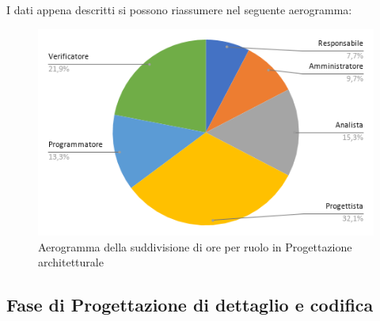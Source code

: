        I dati appena descritti si possono riassumere nel seguente aerogramma:
        \begin{figure}[!h]
            \vspace{5px}
            \includegraphics[scale=0.5]{../../../Images/Diagrammi/Diagramma a torta/ore architettura.png}
            \centering
            \caption{Aerogramma della suddivisione di ore per ruolo in Progettazione architetturale}
        \end{figure}


\subsection{Fase di Progettazione di dettaglio e codifica}

